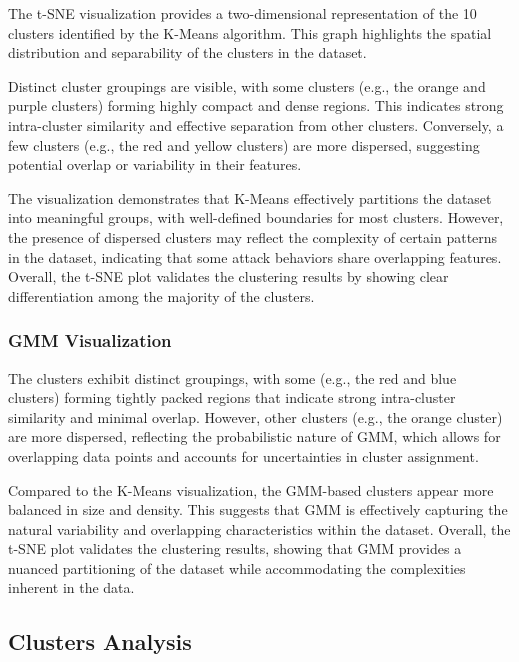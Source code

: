         The t-SNE visualization provides a two-dimensional representation of the 10 clusters identified by the K-Means algorithm. This graph highlights the spatial distribution and separability of the clusters in the dataset.

        Distinct cluster groupings are visible, with some clusters (e.g., the orange and purple clusters) forming highly compact and dense regions. This indicates strong intra-cluster similarity and effective separation from other clusters. Conversely, a few clusters (e.g., the red and yellow clusters) are more dispersed, suggesting potential overlap or variability in their features.

        The visualization demonstrates that K-Means effectively partitions the dataset into meaningful groups, with well-defined boundaries for most clusters. However, the presence of dispersed clusters may reflect the complexity of certain patterns in the dataset, indicating that some attack behaviors share overlapping features. Overall, the t-SNE plot validates the clustering results by showing clear differentiation among the majority of the clusters.
      
        \subsubsection{GMM Visualization \\}

        The clusters exhibit distinct groupings, with some (e.g., the red and blue clusters) forming tightly packed regions that indicate strong intra-cluster similarity and minimal overlap. However, other clusters (e.g., the orange cluster) are more dispersed, reflecting the probabilistic nature of GMM, which allows for overlapping data points and accounts for uncertainties in cluster assignment.

        Compared to the K-Means visualization, the GMM-based clusters appear more balanced in size and density. This suggests that GMM is effectively capturing the natural variability and overlapping characteristics within the dataset. Overall, the t-SNE plot validates the clustering results, showing that GMM provides a nuanced partitioning of the dataset while accommodating the complexities inherent in the data.

    \subsection{Clusters Analysis}

